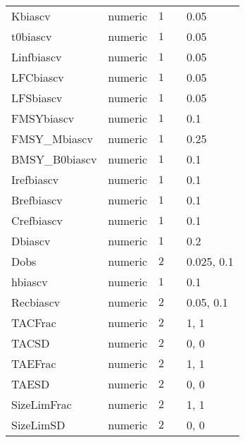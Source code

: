 \begin{longtable}{llrll}
Kbiascv&numeric&$ 1$&&0.05\tabularnewline
t0biascv&numeric&$ 1$&&0.05\tabularnewline
Linfbiascv&numeric&$ 1$&&0.05\tabularnewline
LFCbiascv&numeric&$ 1$&&0.05\tabularnewline
LFSbiascv&numeric&$ 1$&&0.05\tabularnewline
FMSYbiascv&numeric&$ 1$&&0.1\tabularnewline
FMSY\_Mbiascv&numeric&$ 1$&&0.25\tabularnewline
BMSY\_B0biascv&numeric&$ 1$&&0.1\tabularnewline
Irefbiascv&numeric&$ 1$&&0.1\tabularnewline
Brefbiascv&numeric&$ 1$&&0.1\tabularnewline
Crefbiascv&numeric&$ 1$&&0.1\tabularnewline
Dbiascv&numeric&$ 1$&&0.2\tabularnewline
Dobs&numeric&$ 2$&&0.025, 0.1\tabularnewline
hbiascv&numeric&$ 1$&&0.1\tabularnewline
Recbiascv&numeric&$ 2$&&0.05, 0.1\tabularnewline
TACFrac&numeric&$ 2$&&1, 1\tabularnewline
TACSD&numeric&$ 2$&&0, 0\tabularnewline
TAEFrac&numeric&$ 2$&&1, 1\tabularnewline
TAESD&numeric&$ 2$&&0, 0\tabularnewline
SizeLimFrac&numeric&$ 2$&&1, 1\tabularnewline
SizeLimSD&numeric&$ 2$&&0, 0\tabularnewline
\hline
\end{longtable}
